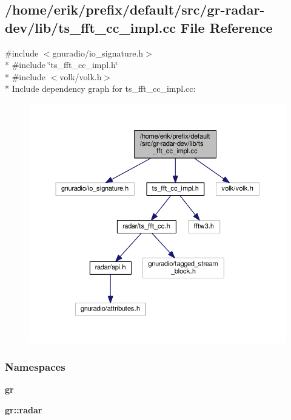 \subsection{/home/erik/prefix/default/src/gr-\/radar-\/dev/lib/ts\+\_\+fft\+\_\+cc\+\_\+impl.cc File Reference}
\label{ts__fft__cc__impl_8cc}
{\ttfamily \#include $<$gnuradio/io\+\_\+signature.\+h$>$}\\*
{\ttfamily \#include \char`\"{}ts\+\_\+fft\+\_\+cc\+\_\+impl.\+h\char`\"{}}\\*
{\ttfamily \#include $<$volk/volk.\+h$>$}\\*
Include dependency graph for ts\+\_\+fft\+\_\+cc\+\_\+impl.\+cc\+:
\nopagebreak
\begin{figure}[H]
\begin{center}
\leavevmode
\includegraphics[width=350pt]{db/d24/ts__fft__cc__impl_8cc__incl}
\end{center}
\end{figure}
\subsubsection*{Namespaces}
\begin{DoxyCompactItemize}
\item 
 {\bf gr}
\item 
 {\bf gr\+::radar}
\end{DoxyCompactItemize}

